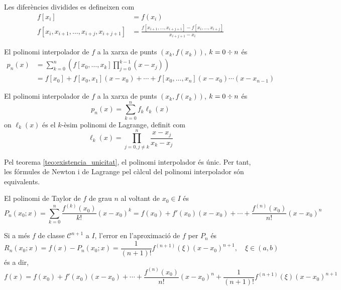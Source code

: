 \begin{definition}
	Les diferències dividides es defineixen com
	\begin{align*}
		f[x_i] &= f(x_i) \\
		f[x_i, x_{i+1}, \ldots, x_{i+j}, x_{i+j+1}] &= 
		\frac{f[x_{i+1}, \ldots, x_{i+j+1}] - f[x_i, \ldots, x_{i+j}]}{x_{i+j+1} - x_i}
	\end{align*}
\end{definition}

\begin{prop}
	El polinomi interpolador de $f$ a la xarxa de punts $(x_k, f(x_k))$, $k = 0 \divisionsymbol n$ és
	\begin{align*}
		p_n(x) 
		&= \sum_{k=0}^{n} \left( f[x_0, \ldots, x_k] \prod_{j=0}^{k-1} (x - x_j) \right) \\
		&= 
		f[x_0] + 
		f[x_0, x_1] \left(x - x_0\right) + \cdots +
		f[x_0, \ldots, x_n] \left( x - x_0 \right) \cdots \left( x - x_{n-1} \right)
	\end{align*}
\end{prop}

\begin{prop}
	El polinomi interpolador de $f$ a la xarxa de punts $(x_k, f(x_k))$, $k = 0 \divisionsymbol n$ és
	\[
		p_n(x) = \sum_{k=0}^n f_k \ell_k(x)
	\]
	on $\ell_k(x)$ és el $k$-èsim polinomi de Lagrange, definit com
	\[
		\ell_k(x) = \prod_{j = 0, j \neq k}^{n} \frac{x - x_j}{x_k - x_j}
	\]
\end{prop}

Pel teorema \ref{teo:existencia_unicitat}, el polinomi interpolador és únic. Per tant, les fórmules de Newton i de Lagrange pel càlcul del polinomi interpolador són equivalents.

\begin{definition}
	El polinomi de Taylor de $f$ de grau $n$ al voltant de $x_0 \in I$ és
	\[
		P_n(x_0;x) = 
		\sum_{k=0}^n \frac{f^{(k)}(x_0)}{k!} {(x - x_0)}^k = 
		f(x_0) + f'(x_0) (x - x_0) + \cdots + 
		\frac{f^{(n)}(x_0)}{n!} (x - x_0)^n
	\]
\end{definition}

\begin{prop}
	Si a més $f$ de classe $\mathscr{C}^{n+1}$ a $I$, l'error en l'aproximació de $f$ per $P_n$ és
	\[
		R_n(x_0;x) = f(x) - P_n(x_0;x) = \frac{1}{(n+1)!} f^{(n+1)}(\xi) {(x - x_0)}^{n+1}, 
		\quad \xi \in (a, b)
	\]
	és a dir,
	\[
		f(x) = 
		f(x_0) + f'(x_0) (x - x_0) + \cdots + 
		\frac{f^{(n)}(x_0)}{n!} (x - x_0)^n + 
		\frac{1}{(n+1)!} f^{(n+1)}(\xi) {(x - x_0)}^{n+1}
	\]
\end{prop}

